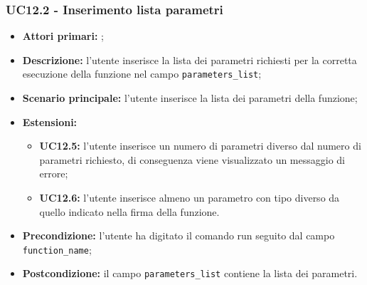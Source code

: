 \subsubsection{UC12.2 - Inserimento lista parametri}
\begin{itemize}
	\item \textbf{Attori primari:} \ua{};
	\item \textbf{Descrizione:} l’utente inserisce la lista dei parametri richiesti per la corretta esecuzione della funzione nel campo \texttt{parameters\_list};
	\item \textbf{Scenario principale:}  l'utente inserisce la lista dei parametri della funzione; 
	\item \textbf{Estensioni:} 
	\begin{itemize}
		\item \textbf{UC12.5:}  l’utente inserisce un numero di parametri diverso dal numero di parametri richiesto, di conseguenza viene visualizzato un messaggio di errore; 
		\item \textbf{UC12.6:} l'utente inserisce almeno un parametro con tipo diverso da quello indicato nella firma della funzione.
	\end{itemize}
	\item \textbf{Precondizione:} l’utente ha digitato il comando run seguito dal campo \texttt{function\_name};
	\item \textbf{Postcondizione:} il campo \texttt{parameters\_list} contiene la lista dei parametri.
\end{itemize}